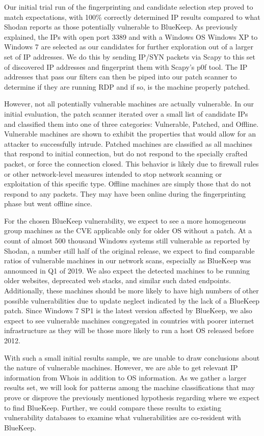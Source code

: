 Our initial trial run of the fingerprinting and candidate selection step proved to match expectations, with 100\% correctly determined IP results compared to what Shodan reports as those potentially vulnerable to BlueKeep. As previously explained, the IPs with open port 3389 and with a Windows OS Windows XP to Windows 7 are selected as our candidates for further exploration out of a larger set of IP addresses. We do this by sending IP/SYN packets via Scapy to this set of discovered IP addresses and fingerprint them with Scapy's p0f tool. The IP addresses that pass our filters can then be piped into our patch scanner to determine if they are running RDP and if so, is the machine properly patched.

However, not all potentially vulnerable machines are actually vulnerable. In our initial evaluation, the patch scanner iterated over a small list of candidate IPs and classified them into one of three categories: Vulnerable, Patched, and Offline. Vulnerable machines are shown to exhibit the properties that would allow for an attacker to successfully intrude. Patched machines are classified as all machines that respond to initial connection, but do not respond to the specially crafted packet, or force the connection closed. This behavior is likely due to firewall rules or other network-level measures intended to stop network scanning or exploitation of this specific type. Offline machines are simply those that do not respond to any packets. They may have been online during the fingerprinting phase but went offline since.

For the chosen BlueKeep vulnerability, we expect to see a more homogeneous group machines as the CVE applicable only for older OS without a patch. At a count of almost 500 thousand Windows systems still vulnerable as reported by Shodan, a number still half of the original release, we expect to find comparable ratios of vulnerable machines in our network scans, especially as BlueKeep was announced in Q1 of 2019. We also expect the detected machines to be running older websites, deprecated web stacks, and similar such dated endpoints. Additionally, these machines should be more likely to have high numbers of other possible vulnerabilities due to update neglect indicated by the lack of a BlueKeep patch. Since Windows 7 SP1 is the latest version affected by BlueKeep, we also expect to see vulnerable machines congregated in countries with poorer internet infrastructure as they will be those more likely to run a host OS released before 2012.

With such a small initial results sample, we are unable to draw conclusions about the nature of vulnerable machines. However, we are able to get relevant IP information from Whois in addition to OS information. As we gather a larger results set, we will look for patterns among the machine classifications that may prove or disprove the previously mentioned hypothesis regarding where we expect to find BlueKeep. Further, we could compare these results to existing vulnerability databases to examine what vulnerabilities are co-resident with BlueKeep.